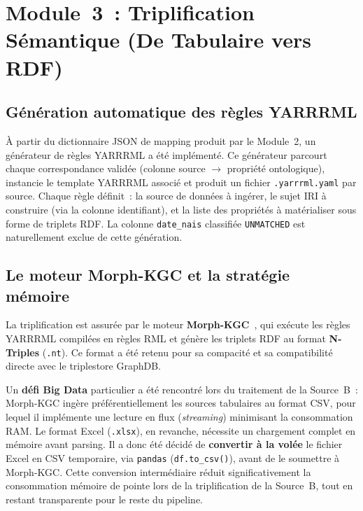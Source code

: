 \section{Module~3~: Triplification Sémantique
        (De Tabulaire vers RDF)}
\label{sec:module3}

\subsection{Génération automatique des règles YARRRML}
\label{subsec:yarrrml_generation}

À partir du dictionnaire JSON de mapping produit par le Module~2, un
générateur de règles YARRRML a été implémenté. Ce générateur parcourt
chaque correspondance validée (colonne source $\rightarrow$ propriété
ontologique), instancie le template YARRRML associé et produit un
fichier \texttt{.yarrrml.yaml} par source. Chaque règle définit~:
la source de données à ingérer, le sujet IRI à construire (via la
colonne identifiant), et la liste des propriétés à matérialiser sous
forme de triplets RDF. La colonne \texttt{date\_nais} classifiée
\texttt{UNMATCHED} est naturellement exclue de cette génération.

\subsection{Le moteur Morph-KGC et la stratégie mémoire}
\label{subsec:morphkgc}

La triplification est assurée par le moteur
\textbf{Morph-KGC}~\cite{arenas2022morphkgc}, qui exécute les règles
YARRRML compilées en règles RML et génère les triplets RDF au format
\textbf{N-Triples} (\texttt{.nt}). Ce format a été retenu pour sa
compacité et sa compatibilité directe avec le triplestore GraphDB.

Un \textbf{défi Big Data} particulier a été rencontré lors du traitement
de la Source~B~: Morph-KGC ingère préférentiellement les sources
tabulaires au format CSV, pour lequel il implémente une lecture en flux
(\textit{streaming}) minimisant la consommation RAM. Le format Excel
(\texttt{.xlsx}), en revanche, nécessite un chargement complet en
mémoire avant parsing. Il a donc été décidé de \textbf{convertir à la
volée} le fichier Excel en CSV temporaire, via
\texttt{pandas} (\texttt{df.to\_csv()}), avant de le soumettre à
Morph-KGC. Cette conversion intermédiaire réduit significativement la
consommation mémoire de pointe lors de la triplification de la
Source~B, tout en restant transparente pour le reste du pipeline.

